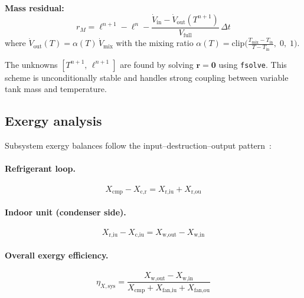 \textbf{Mass residual:}
\begin{equation}\label{eq:ashp-implicit-mass}
  r_M = \ell^{n+1} - \ell^{n}
      - \frac{\dot{V}_\text{in} - \dot{V}_\text{out}(T^{n+1})}{V_\text{full}}\,\Delta t
\end{equation}
where $\dot{V}_\text{out}(T) = \alpha(T)\,\dot{V}_\text{mix}$
with the mixing ratio
$\alpha(T) = \text{clip}\bigl(\frac{T_\text{mix}-T_\text{in}}{T - T_\text{in}},\;0,\;1\bigr)$.

The unknowns $[T^{n+1},\,\ell^{n+1}]$ are found by solving
$\mathbf{r} = \mathbf{0}$ using \texttt{fsolve}.
This scheme is unconditionally stable and handles strong coupling
between variable tank mass and temperature.

\subsection{Exergy analysis}

Subsystem exergy balances follow the input--destruction--output pattern~\cite{tsatsaronis2007}:

\paragraph{Refrigerant loop.}
\begin{equation}\label{eq:ashp-Xr}
  X_\text{cmp} - X_\text{c,r} = X_\text{r,iu} + X_\text{r,ou}
\end{equation}

\paragraph{Indoor unit (condenser side).}
\begin{equation}\label{eq:ashp-Xiu}
  X_\text{r,iu} - X_\text{c,iu} = X_\text{w,out} - X_\text{w,in}
\end{equation}

\paragraph{Overall exergy efficiency.}
\begin{equation}\label{eq:ashp-etaX}
  \eta_{X,\text{sys}} = \frac{X_\text{w,out} - X_\text{w,in}}{X_\text{cmp} + X_\text{fan,iu} + X_\text{fan,ou}}
\end{equation}
